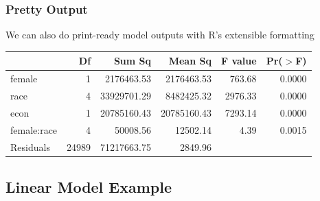 \documentclass{beamer}
\begin{document}
\begin{frame}
\frametitle{Pretty Output}
We can also do print-ready model outputs with R's extensible formatting
\begin{table}[ht]
\begin{center}
\begin{tabular}{lrrrrr}
  \hline
 & Df & Sum Sq & Mean Sq & F value & Pr($>$F) \\ 
  \hline
female      & 1 & 2176463.53 & 2176463.53 & 763.68 & 0.0000 \\ 
  race        & 4 & 33929701.29 & 8482425.32 & 2976.33 & 0.0000 \\ 
  econ        & 1 & 20785160.43 & 20785160.43 & 7293.14 & 0.0000 \\ 
  female:race & 4 & 50008.56 & 12502.14 & 4.39 & 0.0015 \\ 
  Residuals   & 24989 & 71217663.75 & 2849.96 &  &  \\ 
   \hline
\end{tabular}
\end{center}
\end{table}\end{frame}

\subsection{Linear Model Example}
\end{document}

